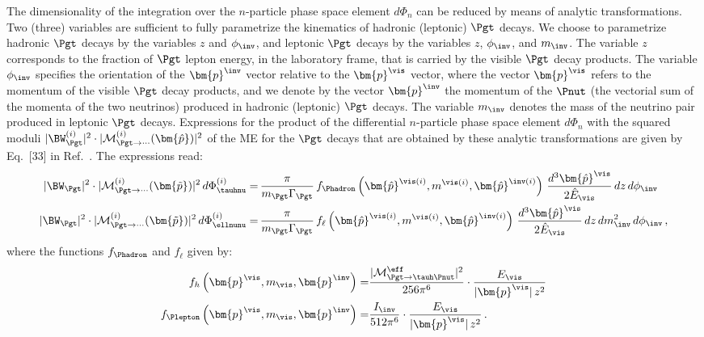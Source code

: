 The dimensionality of the integration over the $n$-particle phase space element $d\Phi_{n}$ 
can be reduced by means of analytic transformations. 
Two (three) variables are sufficient to fully parametrize the kinematics of hadronic (leptonic) $\Pgt$ decays.
We choose to parametrize hadronic $\Pgt$ decays by the variables $z$ and $\phi_{\inv}$,
and leptonic $\Pgt$ decays by the variables $z$, $\phi_{\inv}$, and $m_{\inv}$.
The variable $z$ corresponds to the fraction of $\Pgt$ lepton energy, in the laboratory frame, that is carried by the visible $\Pgt$ decay products.
The variable $\phi_{\inv}$ specifies the orientation of the $\bm{p}^{\inv}$ vector relative to the $\bm{p}^{\vis}$ vector,
where the vector $\bm{p}^{\vis}$ refers to the momentum of the visible $\Pgt$ decay products,
and we denote by the vector $\bm{p}^{\inv}$ the momentum of the $\Pnut$ (the vectorial sum of the momenta of the two neutrinos) produced in hadronic (leptonic) $\Pgt$ decays.
The variable $m_{\inv}$ denotes the mass of the neutrino pair produced in leptonic $\Pgt$ decays.
Expressions for the product of the differential $n$-particle phase space element $d\Phi_{n}$ 
with the squared moduli $\vert \BW^{(i)}_{\Pgt} \vert^{2} \cdot \vert \mathcal{M}^{(i)}_{\Pgt\to\cdots}(\bm{\hat{p}}) \vert^{2}$ 
of the ME for the $\Pgt$ decays that are obtained by these analytic transformations are given by Eq.~[33] in Ref.~\cite{SVfitMEM}.
The expressions read:
\begin{align}
\vert \BW_{\Pgt} \vert^{2} \cdot \vert \mathcal{M}^{(i)}_{\Pgt\to\cdots}(\bm{\tilde{p}}) \vert^{2} \, d\Phi^{(i)}_{\tauhnu} 
 = & \, \frac{\pi}{m_{\Pgt}\Gamma_{\Pgt}} \,
 f_{\Phadron}\left(\bm{\hat{p}}^{\vis(i)}, m^{\vis(i)},
   \bm{\hat{p}}^{\inv(i)}\right) \, \frac{d^{3}\bm{\hat{p}}^{\vis}}{2 \hat{E}_{\vis}} \, dz \, d\phi_{\inv} \nonumber \\
\vert \BW_{\Pgt} \vert^{2} \cdot \vert \mathcal{M}^{(i)}_{\Pgt\to\cdots}(\bm{\tilde{p}}) \vert^{2} \, d\Phi^{(i)}_{\ellnunu} 
 = & \, \frac{\pi}{m_{\Pgt}\Gamma_{\Pgt}} \, f_{\ell}\left(\bm{\hat{p}}^{\vis(i)},
 m^{\vis(i)}, \bm{\hat{p}}^{\inv(i)}\right) \, \frac{d^{3}\bm{\hat{p}}^{\vis}}{2 \hat{E}_{\vis}} \, dz \, dm^{2}_{\inv} \, d\phi_{\inv}
 \nonumber \, ,
\end{align}
where the functions $f_{\Phadron}$ and $f_{\ell}$ given by:
\begin{align}
f_{h}\left(\bm{p}^{\vis}, m_{\vis}, \bm{p}^{\inv}\right) = &
  \frac{\vert\mathcal{M}^{\eff}_{\Pgt \to \tauh\Pnut}\vert^{2}}{256\pi^{6}} \cdot \frac{E_{\vis}}{\vert\bm{p}^{\vis}\vert \, z^{2}} \nonumber \\
f_{\Plepton}\left(\bm{p}^{\vis}, m_{\vis}, \bm{p}^{\inv}\right) = &
  \frac{I_{\inv}}{512\pi^{6}} \cdot \frac{E_{\vis}}{\vert\bm{p}^{\vis}\vert \, z^{2}} \nonumber \, . 
\end{align}

